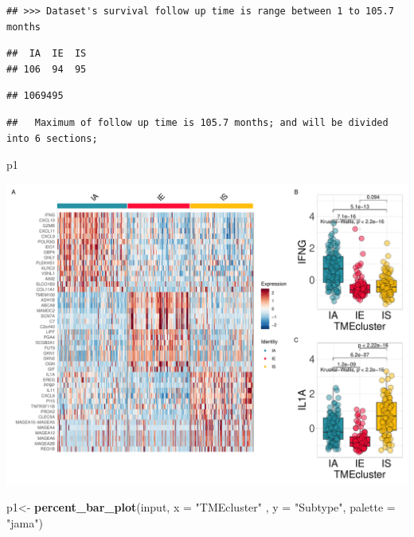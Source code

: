 \documentclass[
  12pt,
]{book}
\newenvironment{Shaded}{\begin{snugshade}}{\end{snugshade}}
\newcommand{\AttributeTok}[1]{\textcolor[rgb]{0.13,0.29,0.53}{#1}}
\newcommand{\FunctionTok}[1]{\textcolor[rgb]{0.13,0.29,0.53}{\textbf{#1}}}
\newcommand{\NormalTok}[1]{#1}
\newcommand{\OtherTok}[1]{\textcolor[rgb]{0.56,0.35,0.01}{#1}}
\newcommand{\StringTok}[1]{\textcolor[rgb]{0.31,0.60,0.02}{#1}}
\theoremstyle{definition}
\theoremstyle{definition}
\theoremstyle{definition}
\theoremstyle{definition}
\theoremstyle{remark}
\begin{document}
\begin{verbatim}
## >>> Dataset's survival follow up time is range between 1 to 105.7 months
\end{verbatim}

\begin{verbatim}
##  IA  IE  IS 
## 106  94  95
\end{verbatim}

\begin{verbatim}
## 1069495
\end{verbatim}

\begin{verbatim}
##   Maximum of follow up time is 105.7 months; and will be divided into 6 sections;
\end{verbatim}

\begin{Shaded}
\begin{Highlighting}[]
\NormalTok{p1}
\end{Highlighting}
\end{Shaded}

\includegraphics{_main_files/figure-latex/unnamed-chunk-25-1.pdf}

\begin{Shaded}
\begin{Highlighting}[]
\NormalTok{p1}\OtherTok{\textless{}{-}} \FunctionTok{percent\_bar\_plot}\NormalTok{(input, }\AttributeTok{x =} \StringTok{"TMEcluster"}\NormalTok{ , }\AttributeTok{y =} \StringTok{"Subtype"}\NormalTok{, }\AttributeTok{palette =} \StringTok{"jama"}\NormalTok{)}
\end{Highlighting}
\end{Shaded}
\end{document}
